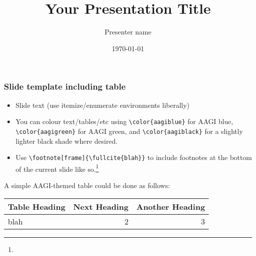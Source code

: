 \documentclass[aspectratio=169]{beamer}
\title[Presentation Title]{Your Presentation Title}
\author[Presenter Name]{Presenter name}
\institute[AAGI]{Your institution name}
\date[\today]{\today}
\begin{document}
  \begin{frame}
    \titlepage
  \end{frame}

  \begin{slide}
    \frametitle{Slide template including table}

    \begin{itemize}
      \item Slide text (use itemize/enumerate environments liberally)
      \item You can colour text/tables/etc using \verb|\color{aagiblue}|
        for {\color{aagiblue}AAGI blue}, \verb|\color{aagigreen}| for
        {\color{aagigreen}AAGI green}, and \verb|\color{aagiblack}| for
        a {\color{aagiblack}slightly lighter black shade} where desired.
      \item Use \verb|\footnote[frame]{\fullcite{blah}}| to include
        footnotes at the bottom of the current slide like
        so.\footnote[frame]{}
    \end{itemize}
    
    A simple AAGI-themed table could be done as follows:
    \begin{table}
      \begin{tabular}{| l | r r |}
      \rowcolor{aagiblue} {\color{white}Table Heading} & %
      {\color{white}Next Heading} & {\color{white}Another Heading} \\
      \hline
      blah & 2 & 3 \\
      \hline
      \end{tabular}
    \end{table}
  \end{slide}
\end{document}
